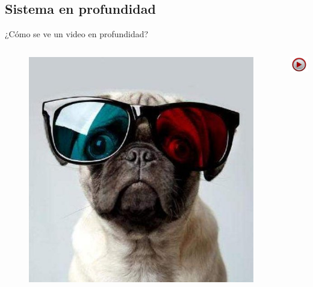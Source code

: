 \documentclass[]{beamer}
\newcommand{\video}[1]{
    \begin{center}
        \href{run:#1}{
            \includegraphics[width=1cm]{img/play.jpeg}
        }
    \end{center}
}
\begin{document}
\subsection{Sistema en profundidad}
\begin{frame}{¿Cómo se ve un video en profundidad?}
    \begin{columns}
        \begin{column}{0.8\textwidth}
            \begin{figure}[t]
                \vspace{-15pt}
                \centering
                \includegraphics[scale=0.4]{img/anteojos/poner_anteojos_3d_5.jpg}
            \end{figure}
        \end{column}
        \begin{column}{0.15\textwidth}
            \video{videos/video_depth.ogv}
        \end{column}
    \end{columns}
\end{frame}
\end{document}
